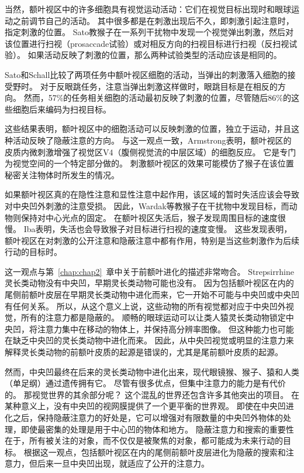 当然，额叶视区中的许多细胞具有视觉运动活动：它们在视觉目标出现时和眼球运动之前调节自己的活动\cite{schall1991neuronal}。
其中很多都是在刺激出现后不久，即刺激引起注意时，指定刺激的位置。
Sato\cite{sato2003effects}教猴子在一系列干扰物中发现一个视觉弹出刺激，然后对该位置进行扫视（prosaccade试验）或对相反方向的扫视目标进行扫视（反扫视试验）。
如果活动反映了刺激的位置，那么两种试验类型的活动应该是相同的。


Sato和Schall比较了两项任务中额叶视区细胞的活动，当弹出的刺激落入细胞的接受野时。
对于反眼跳任务，注意当弹出刺激这样做时，眼跳目标是在相反的方向。
然而，57\%的任务相关细胞的活动最初反映了刺激的位置，尽管随后86\%的这些细胞后来编码为扫视目标。


这些结果表明，额叶视区中的细胞活动可以反映刺激的位置，独立于运动，并且这种活动反映了隐蔽注意的方向。
与这一观点一致，Armstrong\cite{armstrong2007rapid}表明，额叶视区的皮质内微刺激增强了视觉区V4（腹侧视觉流的中层区域）的细胞反应。
它是专门为视觉空间的一个特定部分做的。
刺激额叶视区的效果可能模仿了猴子在该位置秘密关注物体时所发生的情况。


如果额叶视区真的在隐性注意和显性注意中起作用，该区域的暂时失活应该会导致对中央凹外刺激的注意受损。
因此，Wardak等\cite{wardak2004deficit}教猴子在干扰物中发现目标，而动物则保持对中心光点的固定。
在额叶视区失活后，猴子发现周围目标的速度很慢。
Iba\cite{iba2003involvement}表明，失活也会导致猴子对目标进行扫视的速度变慢。
这些发现表明，额叶视区在对刺激的公开注意和隐蔽注意中都有作用，特别是当这些刺激作为后续行动的目标时。


这一观点与第~\ref{chap:chap2}~章中关于前额叶进化的描述非常吻合。
Strepsirrhine灵长类动物没有中央凹，早期灵长类动物可能也没有。
因为包括额叶视区在内的尾侧前额叶皮层在早期灵长类动物中进化而来，它一开始不可能与中央凹或中央凹有任何关系。
所以，从这个意义上说，这些动物的所有视觉都对应于中央凹外视觉，所有的注意力都是隐蔽的。
顺畅的眼球运动可以让类人猿灵长类动物锁定中央凹，将注意力集中在移动的物体上，并保持高分辨率图像。
但这种能力也可能在缺乏中央凹的灵长类动物中进化而来\cite{shepherd2009neuroethology}。
因此，从中央凹视觉或明显的注意力来解释灵长类动物的前额叶皮质的起源是错误的，尤其是尾前额叶皮质的起源。


然而，中央凹最终在后来的灵长类动物中进化出来，现代眼镜猴、猴子、猿和人类（单足纲）通过遗传拥有它。
尽管有很多优点，但集中注意力的能力是有代价的。
那视觉世界的其余部分呢？
这个混乱的世界还包含许多其他突出的项目。
在某种意义上，没有中央凹的视网膜提供了一个更平衡的世界观。
即使在中央凹进化之后，保持隐蔽注意力的好处是，它可以增强对有限数量的中央凹外物体的处理，即使最密集的处理是用于中心凹的物体和地方。
隐蔽注意力和搜索的重要性在于，所有被关注的对象，而不仅仅是被聚焦的对象，都可能成为未来行动的目标。
根据这一观点，包括额叶视区在内的尾侧前额叶皮层进化为隐蔽的搜索和注意力，但后来一旦中央凹出现，就适应了公开的注意力。



